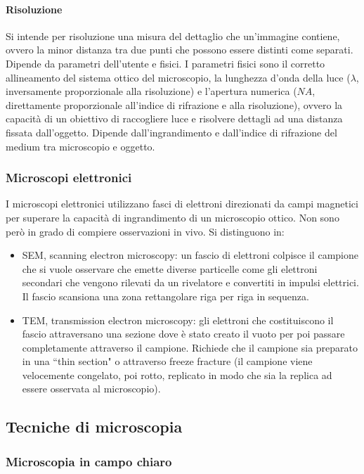\paragraph{Risoluzione}
Si intende per risoluzione una misura del dettaglio che un'immagine contiene, ovvero la minor distanza tra due punti che possono essere distinti come separati. Dipende da parametri 
dell'utente e fisici. I parametri fisici sono il corretto allineamento del sistema ottico del microscopio, la lunghezza d'onda della luce ($\lambda$, inversamente proporzionale alla
risoluzione) e l'apertura numerica ($NA$, direttamente proporzionale all'indice di rifrazione e alla risoluzione), ovvero la capacit\`a di un obiettivo di raccogliere luce e risolvere 
dettagli ad una distanza fissata dall'oggetto. Dipende dall'ingrandimento e dall'indice di rifrazione del medium tra microscopio e oggetto. 
\subsubsection{Microscopi elettronici}
I microscopi elettronici utilizzano fasci di elettroni direzionati da campi magnetici per superare la capacit\`a di ingrandimento di un microscopio ottico. Non sono per\`o in grado di
compiere osservazioni in vivo. Si distinguono in:
\begin{itemize}
	\item SEM, scanning electron microscopy: un fascio di elettroni colpisce il campione che si vuole osservare che emette diverse particelle come gli elettroni secondari che vengono
		rilevati da un rivelatore e convertiti in impulsi elettrici. Il fascio scansiona una zona rettangolare riga per riga in sequenza. 
	\item TEM, transmission electron microscopy: gli elettroni che costituiscono il fascio attraversano una sezione dove \`e stato creato il vuoto per poi passare completamente
		attraverso il campione. Richiede che il campione sia preparato in una ``thin section" o attraverso freeze fracture (il campione viene velocemente congelato, poi rotto, 
		replicato in modo che sia la replica ad essere osservata al microscopio). 
\end{itemize}
\subsection{Tecniche di microscopia}
\subsubsection{Microscopia in campo chiaro}
